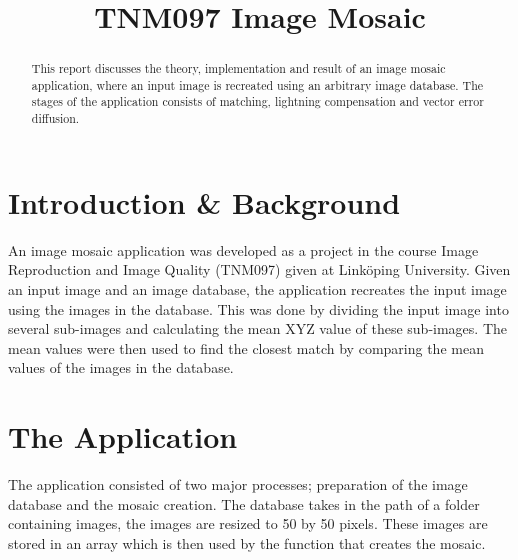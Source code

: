 \documentclass[conference]{IEEEtran}
\begin{document}
%
\title{TNM097 Image Mosaic}

\author{
\and
{}
}

\maketitle

\begin{abstract}
This report discusses the theory, implementation and result of an image mosaic application, where an input image is recreated using an arbitrary image database. The stages of the application consists of matching, lightning compensation and vector error diffusion.
\end{abstract}

\section{Introduction \& Background}

An image mosaic application was developed as a project in the course Image Reproduction and Image Quality (TNM097) given at Linköping University. Given an input image and an image database, the application recreates the input image using the images in the database. This was done by dividing the input image into several sub-images and calculating the mean XYZ value of these sub-images. The mean values were then used to find the closest match by comparing the mean values of the images in the database.

\section{The Application}

The application consisted of two major processes; preparation of the image database and the mosaic creation. The database takes in the path of a folder containing images, the images are resized to 50 by 50 pixels. These images are stored in an array which is then used by the function that creates the mosaic.
\end{document}
